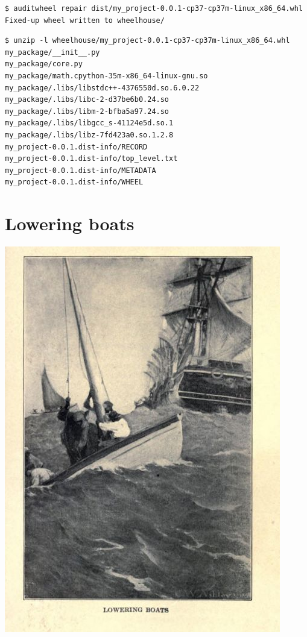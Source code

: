 \documentclass[pdf]{beamer}
\begin{document}
\begin{frame}[fragile]
    \begin{verbatim}
$ auditwheel repair dist/my_project-0.0.1-cp37-cp37m-linux_x86_64.whl
Fixed-up wheel written to wheelhouse/
    \end{verbatim}
\end{frame}

\begin{frame}[fragile]
    \begin{verbatim}
$ unzip -l wheelhouse/my_project-0.0.1-cp37-cp37m-linux_x86_64.whl
my_package/__init__.py
my_package/core.py
my_package/math.cpython-35m-x86_64-linux-gnu.so
my_package/.libs/libstdc++-4376550d.so.6.0.22
my_package/.libs/libc-2-d37be6b0.24.so
my_package/.libs/libm-2-bfba5a97.24.so
my_package/.libs/libgcc_s-41124e5d.so.1
my_package/.libs/libz-7fd423a0.so.1.2.8
my_project-0.0.1.dist-info/RECORD
my_project-0.0.1.dist-info/top_level.txt
my_project-0.0.1.dist-info/METADATA
my_project-0.0.1.dist-info/WHEEL
    \end{verbatim}
\end{frame}

\section{Lowering boats}

\begin{frame}
    \begin{center}
        \includegraphics[height = 0.9\textheight]{img/lowering-boats.jpg}
    \end{center}
\end{frame}
\end{document}

